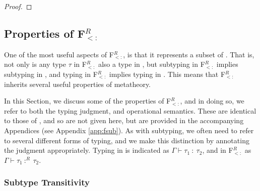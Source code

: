 \documentclass[runningheads]{llncs}
\begin{document}
\begin{proof}
\end{proof}


\subsection{Properties of F$_{<:}^R$}

One of the most useful aspects of F$_{<:}^R$, is that it represents a subset of \Fsub.
That is, not only is any type $\tau$ in F$_{<:}^R$ also a type in \Fsub, but subtyping in F$_{<:}^R$
implies subtyping in \Fsub, and typing in F$_{<:}^R$ implies typing in \Fsub. This means that F$_{<:}^R$
inherits several useful properties of \Fsub metatheory.

In this Section, we discuss some of the properties of F$_{<:}^R$, and in doing so, we refer to both the
typing judgment, and operational semantics. These are identical to those of \Fsub, and so are not 
given here, but are provided in the accompanying Appendices (see Appendix \ref{app:fsub}). As with 
subtyping, we often need to refer to several different forms of typing, and we make this distinction
by annotating the judgment appropriately. Typing in \Fsub is indicated as $\Gamma \vdash \tau_1\ :\ \tau_2$, 
and in F$_{<:}^R$ as $\Gamma \vdash \tau_1\ :^R\ \tau_2$.

\subsubsection{Subtype Transitivity}
\end{document}
